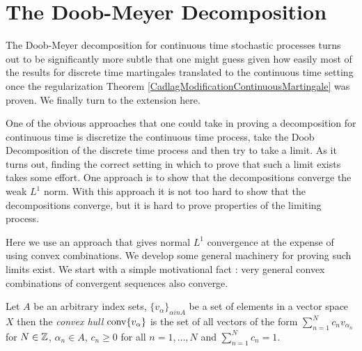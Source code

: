 \section{The Doob-Meyer Decomposition}

The Doob-Meyer decomposition for continuous time stochastic processes turns out to be significantly more subtle that one might guess given how easily most of the results for discrete time martingales translated to the continuous time setting once the regularization Theorem \ref{CadlagModificationContinuousMartingale} was proven.   We finally turn to 
the extension here.  

One of the obvious approaches that one could take in proving a decomposition for continuous time is discretize the continuous time process, take the Doob Decomposition of the discrete time process and then try to take a limit.  As it turns out, finding the correct setting in which to prove that such a limit exists takes some effort.  One approach is to show that the decompositions converge the weak $L^1$ norm.  With this approach it is not too hard to show that the decompositions converge,  but it is hard to prove properties of the limiting process.  

Here we use an approach that gives normal $L^1$ convergence at the expense of using convex combinations.  We develop some general machinery for proving such limits exist.  We start with a simple motivational fact : very general convex combinations of convergent sequences also converge.

\begin{defn}Let $A$ be an arbitrary index sets, $\lbrace v_\alpha \rbrace_{\alpha in A}$ be a set of elements in a vector space $X$ then the \emph{convex hull} $\operatorname*{conv}\{v_\alpha\}$ is the set of all vectors of the form $\sum_{n=1}^N c_n v_{\alpha_n}$ for $N \in \mathbb{Z}$, $\alpha_n \in A$, $c_n \geq 0$ for all $n = 1, \dotsc, N$ and $\sum_{n=1}^N c_n = 1$.
\end{defn}

